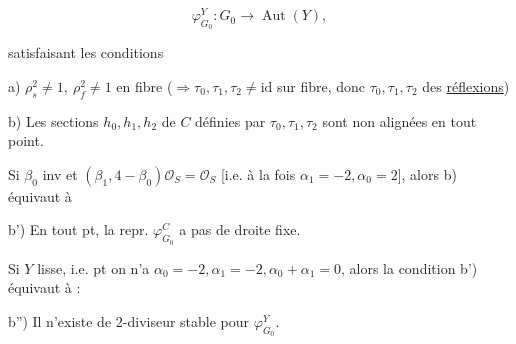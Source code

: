 \[
 \varphi_{G_0}^{Y}:G_0\longrightarrow\operatorname{Aut}(Y),
\]

satisfaisant les conditions

a)  $\rho_s^2\ne1,\ \rho_f^2\ne1$ en  fibre ($\Rightarrow\tau_0,\tau_1,\tau_2\ne\mathrm{id}$ sur  fibre, donc $\tau_0,\tau_1,\tau_2$ des \uline{réflexions})


b) Les sections $h_0,h_1,h_2$ de $C$ définies par $\tau_0,\tau_1,\tau_2$ sont non alignées en tout point. 

Si $\beta_0$ inv et $(\beta_1,4-\beta_0)\mathcal O_S=\mathcal O_S$ [i.e.   à la fois  $\alpha_1=-2,\alpha_0=2$], alors b) équivaut à

b') En tout pt, la repr. $\varphi_{G_0}^C$  a pas de droite fixe.

Si $Y$ lisse, i.e.  pt on n'a  $\alpha_0=-2,\alpha_1=-2,\alpha_0+\alpha_1=0$, alors la condition b') équivaut à :

b'')  Il n'existe  de $2$-diviseur stable pour $\varphi_{G_0}^{Y}$.
